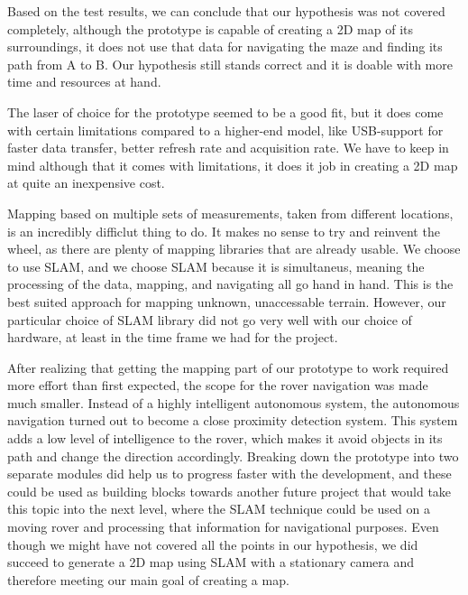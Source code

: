 Based on the test results, we can conclude that our hypothesis was not covered completely, although the prototype is capable of creating a 2D map of its surroundings, it does not use that data for navigating the maze and finding its path from A to B. Our hypothesis still stands correct and it is doable with more time and resources at hand.

The laser of choice for the prototype seemed to be a good fit, but it does come with certain limitations compared to a higher-end model, like USB-support for faster data transfer, better refresh rate and acquisition rate. We have to keep in mind although that it comes with limitations, it does it job in creating a 2D map at quite an inexpensive cost.

Mapping based on multiple sets of measurements, taken from different locations, is an incredibly difficlut thing to do. It makes no sense to try and reinvent the wheel, as there are plenty of mapping libraries that are already usable. We choose to use SLAM, and we choose SLAM because it is simultaneus, meaning the processing of the data, mapping, and navigating all go hand in hand. This is the best suited approach for mapping unknown, unaccessable terrain. However, our particular choice of SLAM library did not go very well with our choice of hardware, at least in the time frame we had for the project.

After realizing that getting the mapping part of our prototype to work required more effort than first expected, the scope for the rover navigation was made much smaller. Instead of a highly intelligent autonomous system, the autonomous navigation turned out to become a close proximity detection system. This system adds a low level of intelligence to the rover, which makes it avoid objects in its path and change the direction accordingly. 
Breaking down the prototype into two separate modules did help us to progress faster with the development, and these could be used as building blocks towards another future project that would take this topic into the next level, where the SLAM technique could be used on a moving rover and processing that information for navigational purposes. Even though we might have not covered all the points in our hypothesis, we did succeed to generate a 2D map using SLAM with a stationary camera and therefore meeting our main goal of creating a map. 
